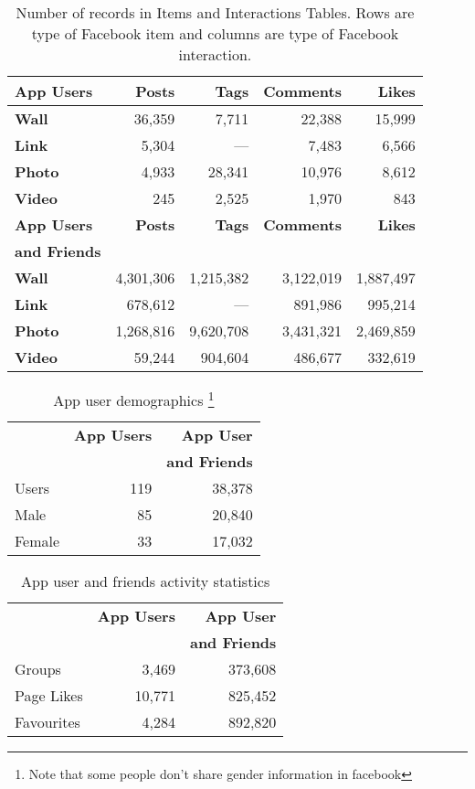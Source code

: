       							
 

\begin{table}
\centering
\begin{tabular}{|>{\small}l|>{\small}r|>{\small}r|>{\small}r|>{\small}r|}
\hline
\textbf{App Users} & \textbf{Posts} & \textbf{Tags} & \textbf{Comments} & \textbf{Likes} \\
\hline
\textbf{Wall} & 36,359 & 7,711 & 22,388 & 15,999 \\
\hline
\textbf{Link} & 5,304 & --- & 7,483 & 6,566 \\
\hline
\textbf{Photo} & 4,933 & 28,341 & 10,976 & 8,612 \\
\hline
\textbf{Video} & 245 & 2,525 & 1,970 & 843 \\
\hline
\hline
\textbf{App Users} & \textbf{Posts} & \textbf{Tags} & \textbf{Comments} & \textbf{Likes} \\
\textbf{and Friends} & & & & \\
\hline
\textbf{Wall} & 4,301,306 & 1,215,382 & 3,122,019 & 1,887,497 \\
\hline
\textbf{Link} & 678,612 & --- & 891,986 & 995,214 \\
\hline
\textbf{Photo} & 1,268,816 & 9,620,708 & 3,431,321 & 2,469,859 \\
\hline
\textbf{Video} & 59,244 & 904,604 & 486,677 & 332,619 \\
\hline
\end{tabular}
\caption{Number of records in Items and Interactions Tables. Rows are type of Facebook item and columns are type of Facebook interaction.}
\label{tab:interactions}
\end{table}


\begin{table}
\centering
\begin{tabular}{|>{\small}l|>{\small}r|>{\small}r|}
\hline
& \textbf{App Users} & \textbf{App User} \\
& & \textbf{and Friends} \\
\hline
Users & 119 & 38,378 \\
\hline
Male & 85 & 20,840 \\
\hline
Female & 33 & 17,032 \\
\hline
\end{tabular}
\caption{App user demographics \footnote{Note that some people don't share gender information in facebook}}
\label{tab:demographics}
\end{table}

\begin{table}
\centering
\begin{tabular}{|>{\small}l|>{\small}r|>{\small}r|}
\hline
& \textbf{App Users} & \textbf{App User} \\
& & \textbf{and Friends} \\
\hline
Groups & 3,469 & 373,608 \\
\hline
Page Likes & 10,771 & 825,452 \\
\hline
Favourites & 4,284 & 892,820\\
\hline
\end{tabular}
\caption{App user and friends activity statistics }
\label{tab:interests}
\end{table}


